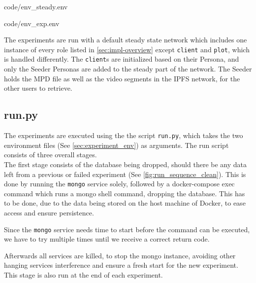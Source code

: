\noindent\begin{minipage}[t]{.40\textwidth}

                {code/env_steady.env}
\end{minipage}
\hfill
\begin{minipage}[t]{.51\textwidth}

                {code/env_exp.env}
\end{minipage}\bigskip

The experiments are run with a default steady state network which includes one instance of every role listed in \autoref{sec:impl-overview} except \texttt{client} and \texttt{plot}, which is handled differently. The \texttt{client}s are initialized based on their Persona, and only the Seeder Personas are added to the steady part of the network.
The Seeder holds the \ac{MPD} file as well as the video segments in the \ac{IPFS} network, for the other users to retrieve. 






\subsection{run.py}
\label{sec:experiment_run}
The experiments are executed using the the script \texttt{run.py}, which takes the two environment files (See \autoref{sec:experiment_env}) as arguments. The run script consists of three overall stages.
\\


\noindent The first stage consists of the database being dropped, should there be any data left from a previous or failed experiment (See \autoref{fig:run_sequence_clean}). 
This is done by running the \texttt{mongo} service solely, followed by a docker-compose exec command which runs a mongo shell command, dropping the database. This has to be done, due to the data being stored on the host machine of Docker, to ease access and ensure persistence.

Since the \texttt{mongo} service needs time to start before the command can be executed, we have to try multiple times until  we receive a correct return code.

Afterwards all services are killed, to stop the mongo instance, avoiding other hanging services interference and ensure a fresh start for the new experiment. This stage is also run at the end of each experiment.
\\


